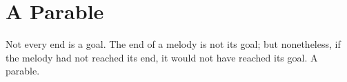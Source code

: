 \section{A Parable}

\begin{quotex}
Not every end is a goal. The end of a melody is not its goal; but nonetheless, if the melody had not reached its end, it would not have reached its goal. A parable.
\end{quotex}


